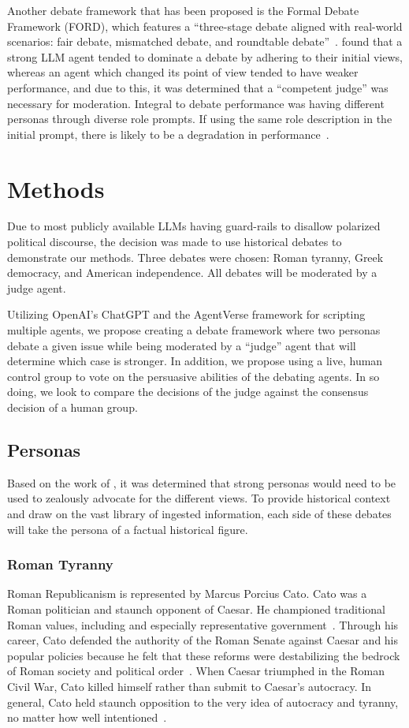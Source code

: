 \documentclass[jair,twoside,11pt,theapa]{article}
\begin{document}
Another debate framework that has been proposed is the Formal Debate Framework (FORD), which features a ``three-stage debate aligned with real-world scenarios: fair debate, mismatched debate, and roundtable debate''~.   found that a strong LLM agent tended to dominate a debate by adhering to their initial views, whereas an agent which changed its point of view tended to have weaker performance, and due to this, it was determined that a ``competent judge'' was necessary for moderation.  Integral to debate performance was having different personas through diverse role prompts.  If using the same role description in the initial prompt, there is likely to be a degradation in performance~.

\section{Methods}
Due to most publicly available LLMs having guard-rails to disallow polarized political discourse, the decision was made to use historical debates to demonstrate our methods.  Three debates were chosen: Roman tyranny, Greek democracy, and American independence.  All debates will be moderated by a judge agent.

Utilizing OpenAI's ChatGPT and the AgentVerse framework for scripting multiple agents, we propose creating a debate framework where two personas debate a given issue while being moderated by a ``judge'' agent that will determine which case is stronger.  In addition, we propose using a live, human control group to vote on the persuasive abilities of the debating agents.  In so doing, we look to compare the decisions of the judge against the consensus decision of a human group.

\subsection{Personas}
Based on the work of , it was determined that strong personas would need to be used to zealously advocate for the different views.  To provide historical context and draw on the vast library of ingested information, each side of these debates will take the persona of a factual historical figure.

\subsubsection{Roman Tyranny}
Roman Republicanism is represented by Marcus Porcius Cato.  Cato was a Roman politician and staunch opponent of Caesar.  He championed traditional Roman values, including and especially representative government~.  Through his career, Cato defended the authority of the Roman Senate against Caesar and his popular policies because he felt that these reforms were destabilizing the bedrock of Roman society and political order~.  When Caesar triumphed in the Roman Civil War, Cato killed himself rather than submit to Caesar's autocracy.  In general, Cato held staunch opposition to the very idea of autocracy and tyranny, no matter how well intentioned~.
\end{document}
